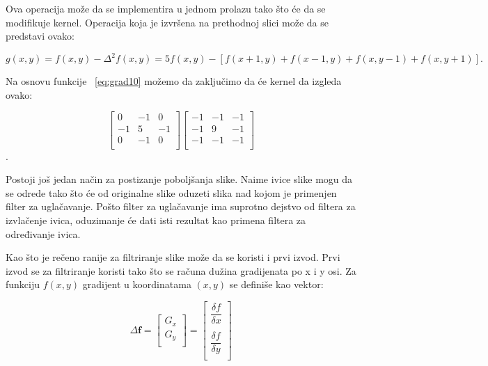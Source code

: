 \documentclass[a4paper,12pt,titlepage]{article}
\begin{document}
Ova operacija može da se implementira u jednom prolazu tako što će da se modifikuje kernel. Operacija koja je izvršena na prethodnoj slici može da se predstavi ovako:

\begin{equation}\label{eq:grad10}
g(x, y) = f(x, y) - \Delta^{2}f(x, y) = 5f(x, y) - [f(x + 1, y) + f(x - 1, y) + f(x, y - 1) + f(x, y + 1)].
\end{equation} 

\newpage
Na osnovu funkcije ~\ref{eq:grad10} možemo da zaključimo da će kernel da izgleda ovako:

\[
\begin{bmatrix}
0 & -1 & 0 \\
-1 & 5 & -1 \\
0 & -1 & 0 \\
\end{bmatrix}
\begin{bmatrix}
-1 & -1 & -1 \\
-1 & 9 & -1 \\
-1 & -1 & -1 \\
\end{bmatrix}
\]. 

Postoji još jedan način za postizanje poboljšanja slike. Naime ivice slike mogu da se odrede tako što će od originalne slike oduzeti slika nad kojom je primenjen filter za uglačavanje. Pošto filter za uglačavanje ima suprotno dejstvo od filtera za izvlačenje ivica, oduzimanje će dati isti rezultat kao primena filtera za određivanje ivica. 

Kao što je rečeno ranije za filtriranje slike može da se koristi i prvi izvod. Prvi izvod se za filtriranje koristi tako što se računa dužina gradijenata po x i y osi. Za funkciju $f(x, y)$ gradijent u koordinatama $(x, y)$ se definiše kao vektor:

\begin{equation}\label{eq:grad11}
\Delta \textbf{f}
=
\begin{bmatrix}
G_{x} \\
G_{y} \\
\end{bmatrix}
=
\begin{bmatrix}
\dfrac{\delta f}{\delta x} \\
\\
\dfrac{\delta f}{\delta y} \\
\end{bmatrix}
\end{equation}\\
\end{document}
